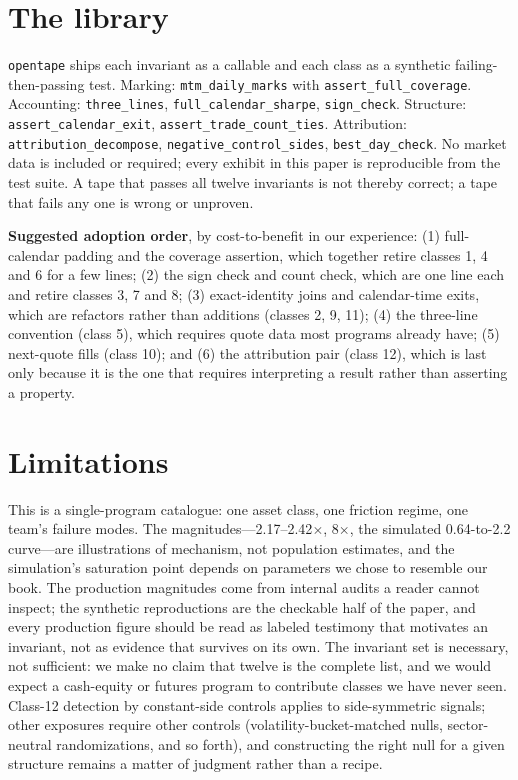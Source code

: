 \documentclass[11pt]{article}
\begin{document}
\section{The library}
\begin{sloppypar}
\texttt{opentape} ships each invariant as a callable and each class as a synthetic
failing-then-passing test. Marking: \texttt{mtm\_daily\_marks} with
\texttt{assert\_full\_coverage}. Accounting: \texttt{three\_lines},
\texttt{full\_calendar\_sharpe}, \texttt{sign\_check}. Structure:
\texttt{assert\_calendar\_exit}, \texttt{assert\_trade\_count\_ties}. Attribution:
\texttt{attribution\_decompose}, \texttt{negative\_control\_sides}, \texttt{best\_day\_check}.
No market data is included or required; every exhibit in this paper is reproducible from the
test suite. A tape that passes all twelve invariants is not thereby correct; a tape that fails
any one is wrong or unproven.
\end{sloppypar}

\textbf{Suggested adoption order}, by cost-to-benefit in our experience: (1) full-calendar
padding and the coverage assertion, which together retire classes 1, 4 and 6 for a few lines;
(2) the sign check and count check, which are one line each and retire classes 3, 7 and 8;
(3) exact-identity joins and calendar-time exits, which are refactors rather than additions
(classes 2, 9, 11); (4) the three-line convention (class 5), which requires quote data most
programs already have; (5) next-quote fills (class 10); and (6) the attribution pair
(class 12), which is last only because it is the one that requires interpreting a result rather
than asserting a property.

\section{Limitations}
This is a single-program catalogue: one asset class, one friction regime, one team's failure
modes. The magnitudes---2.17--2.42$\times$, 8$\times$, the simulated 0.64-to-2.2 curve---are
illustrations of mechanism, not population estimates, and the simulation's saturation point
depends on parameters we chose to resemble our book. The production magnitudes come from
internal audits a reader cannot inspect; the synthetic reproductions are the checkable half of
the paper, and every production figure should be read as labeled testimony that motivates an
invariant, not as evidence that survives on its own. The invariant set is necessary, not
sufficient: we make no claim that twelve is the complete list, and we would expect a
cash-equity or futures program to contribute classes we have never seen. Class-12 detection by
constant-side controls applies to side-symmetric signals; other exposures require other
controls (volatility-bucket-matched nulls, sector-neutral randomizations, and so forth), and
constructing the right null for a given structure remains a matter of judgment rather than a
recipe.
\end{document}
